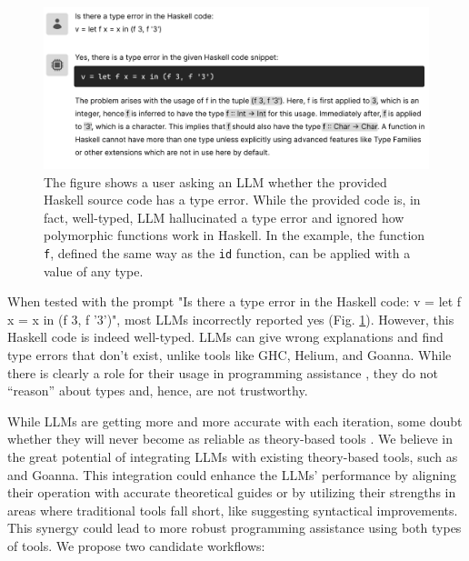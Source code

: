 \begin{figure}[hbt]
  \includegraphics[width=\linewidth]{LLM2}
  \caption[An example where LLM identified a type error in well-typed source code]{\label{fig:llm2}
  The figure shows a user asking an LLM whether the provided Haskell source code has a type error. While the provided code is, in fact, well-typed, LLM hallucinated a type error and ignored how polymorphic functions work in Haskell. In the example, the function \texttt{f},  defined the same way as the \texttt{id} function, can be applied with a value of any type.
    } 
\end{figure}

When tested with the prompt "Is there a type error in the Haskell code: v = let f x = x in (f 3, f '3')", most LLMs incorrectly reported yes (Fig. \ref{fig:llm2}). However, this Haskell code is indeed well-typed. LLMs can give wrong explanations and find type errors that don't exist, unlike tools like GHC, Helium, and Goanna. While there is clearly a role for their usage in programming assistance \cite{Lee2024-hs}, they do not “reason” about types and, hence, are not trustworthy.

While LLMs are getting more and more accurate with each iteration, some doubt whether they will never become as reliable as theory-based tools \cite{Berglund2023-ig}. We believe in the great potential of integrating LLMs with existing theory-based tools, such as \chameleon{} and Goanna. This integration could enhance the LLMs' performance by aligning their operation with accurate theoretical guides or by utilizing their strengths in areas where traditional tools fall short, like suggesting syntactical improvements. This synergy could lead to more robust programming assistance using both types of tools. We propose two candidate workflows:



